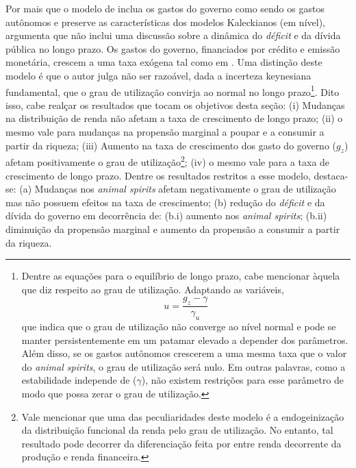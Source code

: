


Por mais que o modelo de \textcite{allain_macroeconomic_2014} inclua os gastos do governo como sendo os gastos autônomos e preserve as características dos modelos Kaleckianos (em nível), \textcite{hein_autonomous_2018} argumenta que não inclui uma discussão sobre a dinâmica do \textit{déficit} e da dívida pública no longo prazo. Os gastos do governo, financiados por crédito e emissão monetária, crescem a uma taxa exógena tal como em \textcite{allain_macroeconomic_2014}. Uma distinção deste modelo é que o autor julga não ser razoável, dada a incerteza keynesiana fundamental, que o grau de utilização convirja ao normal no longo prazo\footnote{Dentre as equações para o equilíbrio de longo prazo, cabe mencionar àquela que diz respeito ao grau de utilização. Adaptando as variáveis,
$$
u = \frac{g_z - \gamma}{\gamma_u}
$$
que indica que o grau de utilização não converge ao nível normal e pode se manter persistentemente em um patamar elevado a depender dos parâmetros. Além disso, se os gastos autônomos crescerem a uma mesma taxa que o valor do \textit{animal spirits}, o grau de utilização será nulo. Em outras palavras, como a estabilidade independe de ($\gamma$), não existem restrições para esse parâmetro de modo que possa zerar o grau de utilização.
}. 
Dito isso, cabe realçar os resultados que tocam os objetivos desta seção: (i) Mudanças na distribuição de renda não afetam a taxa de crescimento de longo prazo; (ii) o mesmo vale para mudanças na propensão marginal a poupar e a consumir a partir da riqueza; (iii) Aumento na taxa de crescimento dos gasto do governo ($g_z$) afetam positivamente o grau de utilização\footnote{Vale mencionar que uma das peculiaridades deste modelo é a endogeinização da distribuição funcional da renda pelo grau de utilização. No entanto, tal resultado pode decorrer da diferenciação feita por \textcite{hein_autonomous_2018} entre renda decorrente da produção e renda financeira.}; (iv) o mesmo vale para a taxa de crescimento de longo prazo. Dentre os resultados restritos a esse modelo, destaca-se:  (a) Mudanças nos \textit{animal spirits} afetam negativamente o grau de utilização mas não possuem efeitos na taxa de crescimento; (b) redução do \textit{déficit} e da dívida do governo em decorrência de: (b.i) aumento nos \textit{animal spirits}; (b.ii) diminuição da propensão marginal e aumento da propensão a consumir a partir da riqueza. 

